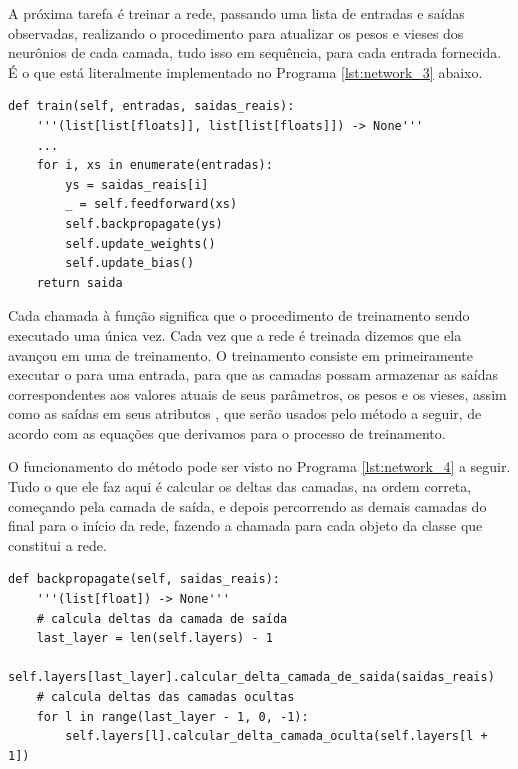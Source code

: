 A próxima tarefa é treinar a rede, passando uma lista de entradas e saídas observadas, realizando o procedimento  para atualizar os pesos e vieses dos neurônios de cada camada, tudo isso em sequência, para cada entrada fornecida. É o que está literalmente implementado no Programa \ref{lst:network_3} abaixo.
\newline
\estiloR
\begin{lstlisting}[caption={Trecho da classe \eng{Network}}, label={lst:network_3}, escapeinside={\%}]
def train(self, entradas, saidas_reais):
    '''(list[list[floats]], list[list[floats]]) -> None'''
    ...
    for i, xs in enumerate(entradas):
        ys = saidas_reais[i]
        _ = self.feedforward(xs)
        self.backpropagate(ys)
        self.update_weights()
        self.update_bias()
	return saida
\end{lstlisting}


Cada chamada à função  significa que o procedimento de treinamento sendo executado uma única vez. Cada vez que a rede é treinada dizemos que ela avançou em uma  de treinamento. O treinamento consiste em primeiramente executar o  para uma entrada, para que as camadas possam armazenar as saídas correspondentes aos valores atuais de seus parâmetros, os pesos e os vieses, assim como as saídas em seus atributos , que serão usados pelo método  a seguir, de acordo com as equações que derivamos para o processo de treinamento.

O funcionamento do método  pode ser visto no Programa \ref{lst:network_4} a seguir. Tudo o que ele faz aqui é calcular os deltas das camadas, na ordem correta, começando pela camada de saída, e depois percorrendo as demais camadas do final para o início da rede, fazendo a chamada para cada objeto da classe  que constitui a rede.
\newline
\estiloR
\begin{lstlisting}[caption={Trecho da classe \eng{Network}}, label={lst:network_4}, escapeinside={\%}]
def backpropagate(self, saidas_reais):
    '''(list[float]) -> None'''
    # calcula deltas da camada de saída
    last_layer = len(self.layers) - 1
    self.layers[last_layer].calcular_delta_camada_de_saida(saidas_reais)
    # calcula deltas das camadas ocultas
    for l in range(last_layer - 1, 0, -1):
        self.layers[l].calcular_delta_camada_oculta(self.layers[l + 1])
\end{lstlisting}


